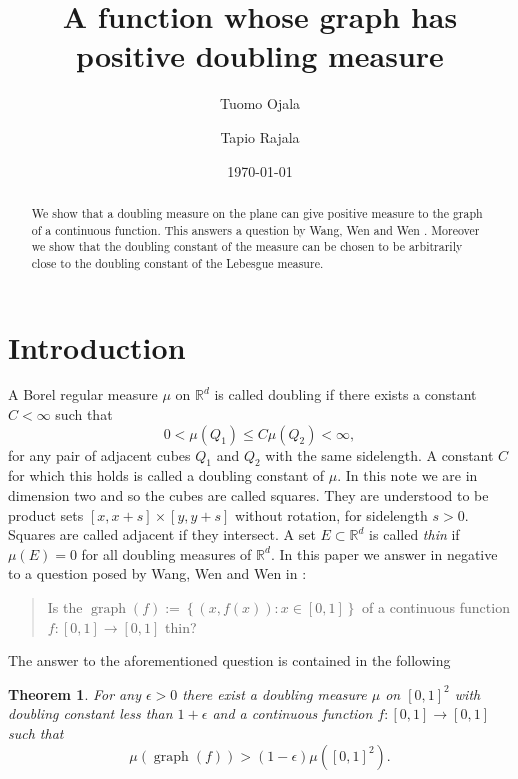 \documentclass[reqno,12pt]{amsart}
\theoremstyle{plain}
\newtheorem{theorem}{Theorem}[section]
\theoremstyle{remark}
\begin{document}
\title{A function whose graph has positive doubling measure}

\author{Tuomo Ojala}
\author{Tapio Rajala}

\address{Department of Mathematics and Statistics \\
         P.O. Box 35 (MaD) \\
         FI-40014 University of Jyv\"askyl\"a \\
         Finland}

\date{\today}

\begin{abstract}
  We show that a doubling measure on the plane can give positive measure to the graph of a continuous function. This answers
  a question by Wang, Wen and Wen \cite{WangWenWen2013}. Moreover we show that the doubling constant
  of the measure can be chosen to be arbitrarily close to the doubling constant of the Lebesgue measure.
\end{abstract}

\maketitle
\section{Introduction}
A Borel regular measure $\mu$ on ${\ensuremath{\mathbb{R}}}^d$ is called doubling if there exists 
a constant $C < \infty$ such that
\[
0 < \mu(Q_1) \leq C \mu(Q_2) < \infty,
\]
for any pair of adjacent cubes $Q_1$ and $Q_2$ with the same sidelength. A constant $C$ for which this holds
is called a doubling constant of $\mu$.
In this note we are in dimension two and so the cubes are called squares.
They are understood to be product sets $[x,x+s] \times [y,y+s]$ without rotation, for sidelength $s>0$.
Squares are called adjacent if they intersect.
A set $E \subset {\ensuremath{\mathbb{R}}}^d$ is called \emph{thin} if $\mu(E)=0$ for all doubling measures of ${\ensuremath{\mathbb{R}}}^d$.
In this paper we answer in negative to a question posed by Wang, Wen and Wen in \cite[Problem 1]{WangWenWen2013}: 
\begin{quote}
Is the $\operatorname{graph}(f):=\left\{ (x,f(x)): x \in [0,1] \right\}$ of a continuous function $f: [0,1] \to [0,1]$ thin? 
\end{quote}
The answer to the aforementioned question is contained in the following
\begin{theorem} \label{thm:continuouscase}
  For any $\epsilon>0$ there exist a doubling measure $\mu$ on $[0,1]^2$ with doubling constant less than $1 + \epsilon$
  and a continuous function $f \colon [0,1] \to [0,1]$ such that 
 \begin{equation}\label{eq:largemeasurecontinuous}
  \mu(\operatorname{graph}(f)) > (1-\epsilon)\mu([0,1]^2).  
 \end{equation}
\end{theorem}
\end{document}
